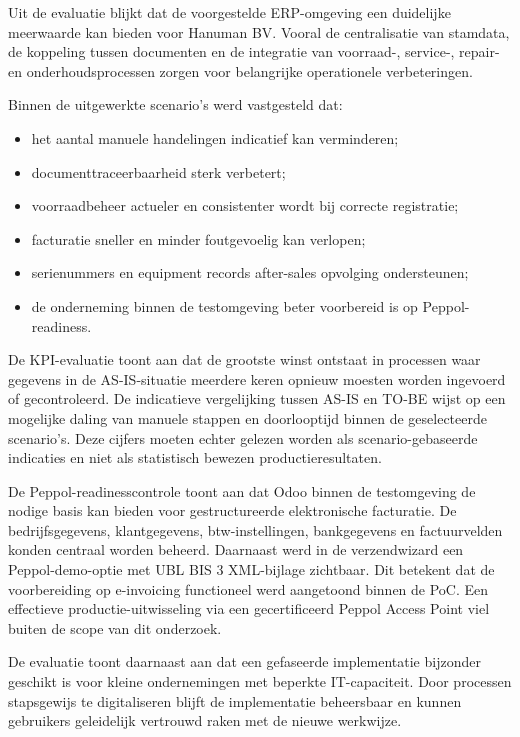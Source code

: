 Uit de evaluatie blijkt dat de voorgestelde ERP-omgeving een duidelijke meerwaarde kan bieden voor Hanuman BV. Vooral de centralisatie van stamdata, de koppeling tussen documenten en de integratie van voorraad-, service-, repair- en onderhoudsprocessen zorgen voor belangrijke operationele verbeteringen.

Binnen de uitgewerkte scenario's werd vastgesteld dat:
\begin{itemize}
    \item het aantal manuele handelingen indicatief kan verminderen;
    \item documenttraceerbaarheid sterk verbetert;
    \item voorraadbeheer actueler en consistenter wordt bij correcte registratie;
    \item facturatie sneller en minder foutgevoelig kan verlopen;
    \item serienummers en equipment records after-sales opvolging ondersteunen;
    \item de onderneming binnen de testomgeving beter voorbereid is op Peppol-readiness.
\end{itemize}

De KPI-evaluatie toont aan dat de grootste winst ontstaat in processen waar gegevens in de AS-IS-situatie meerdere keren opnieuw moesten worden ingevoerd of gecontroleerd. De indicatieve vergelijking tussen AS-IS en TO-BE wijst op een mogelijke daling van manuele stappen en doorlooptijd binnen de geselecteerde scenario's. Deze cijfers moeten echter gelezen worden als scenario-gebaseerde indicaties en niet als statistisch bewezen productieresultaten.

De Peppol-readinesscontrole toont aan dat Odoo binnen de testomgeving de nodige basis kan bieden voor gestructureerde elektronische facturatie. De bedrijfsgegevens, klantgegevens, btw-instellingen, bankgegevens en factuurvelden konden centraal worden beheerd. Daarnaast werd in de verzendwizard een Peppol-demo-optie met UBL BIS 3 XML-bijlage zichtbaar. Dit betekent dat de voorbereiding op e-invoicing functioneel werd aangetoond binnen de PoC. Een effectieve productie-uitwisseling via een gecertificeerd Peppol Access Point viel buiten de scope van dit onderzoek.

De evaluatie toont daarnaast aan dat een gefaseerde implementatie bijzonder geschikt is voor kleine ondernemingen met beperkte IT-capaciteit. Door processen stapsgewijs te digitaliseren blijft de implementatie beheersbaar en kunnen gebruikers geleidelijk vertrouwd raken met de nieuwe werkwijze.

